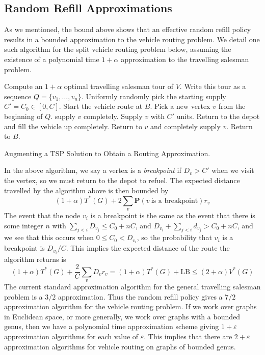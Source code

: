 \documentclass{article}
\theoremstyle{plain}
\begin{document}
\subsection{Random Refill Approximations}

As we mentioned, the bound above shows that an effective random refill policy results in a bounded approximation to the vehicle routing problem. We detail one such algorithm for the split vehicle routing problem below, assuming the existence of a polynomial time $1 + \alpha$ approximation to the travelling salesman problem.

\begin{algorithm}
\begin{algorithmic}[1]
\State Compute an $1 + \alpha$ optimal travelling salesman tour of $V$. Write this tour as a sequence $Q = \{ v_1, \dots, v_n \}$.
\State Uniformly randomly pick the starting supply $C' = C_0 \in [0,C]$.
\State Start the vehicle route at $B$.
\State Pick a new vertex $v$ from the beginning of $Q$.
 supply $v$ completely.
    \State Supply $v$ with $C'$ units.
    \State Return to the depot and fill the vehicle up completely.
    \State Return to $v$ and completely supply $v$.
\EndIf
\EndWhile
\State Return to $B$.
\end{algorithmic}
\caption{Augmenting a TSP Solution to Obtain a Routing Approximation.}
\label{alg:TSPAugmentationSplit}
\end{algorithm}

In the above algorithm, we say a vertex is a {\it breakpoint} if $D_v > C'$ when we visit the vertex, so we must return to the depot to refuel. The expected distance travelled by the algorithm above is then bounded by
%
\[ (1 + \alpha) T^*(G) + 2 \sum_v \mathbf{P}(v\ \text{is a breakpoint}) r_v \]
%
The event that the node $v_i$ is a breakpoint is the same as the event that there is some integer $n$ with $\sum_{j < i} D_{v_j} \leq C_0 + nC$, and $D_{v_i} + \sum_{j < i} d_{v_j} > C_0 + nC$, and we see that this occurs when $0 \leq C_0 < D_{v_i}$, so the probability that $v_i$ is a breakpoint is $D_{v_i}/C$. This implies the expected distance of the route the algorithm returns is
%
\[ (1 + \alpha) T^*(G) + \frac{2}{C} \sum_v D_v r_v = (1 + \alpha) T^*(G) + \text{LB} \leq (2 + \alpha) V^*(G) \]
%
The current standard approximation algorithm for the general travelling salesman problem is a $3/2$ approximation. Thus the random refill policy gives a $7/2$ approximation algorithm for the vehicle routing problem. If we work over graphs in Euclidean space, or more generally, we work over graphs with a bounded genus, then we have a polynomial time approximation scheme giving $1 + \varepsilon$ approximation algorithms for each value of $\varepsilon$. This implies that there are $2 + \varepsilon$ approximation algorithms for vehicle routing on graphs of bounded genus.
\end{document}
